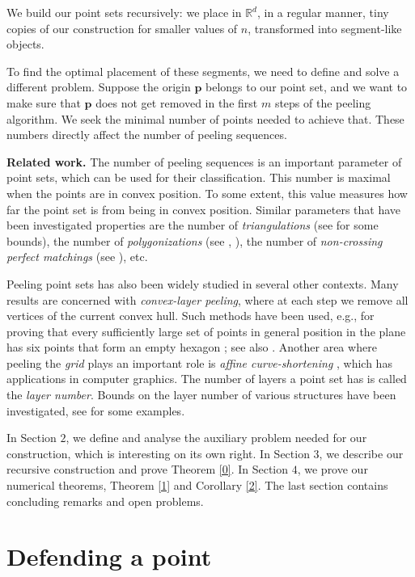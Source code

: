 \documentclass[a4paper,UKenglish,cleveref, autoref, thm-restate]{lipics-v2021}
\def\R{\mathbb{R}}
\begin{document}
   We build our point sets recursively: we place in $\R^d$, in a regular manner, tiny copies of our construction for smaller values of $n$, transformed into segment-like objects.

   To find the optimal placement of these segments, we need to define and solve a different problem. Suppose the origin $\mathbf{p}$ belongs to our point set, and we want to make sure that $\mathbf{p}$ does not get removed in the first $m$ steps of the peeling algorithm. We seek the minimal number of points needed to achieve that. These numbers directly affect the number of peeling sequences.
\smallskip

   \textbf{Related work.} The number of peeling sequences is an important parameter of point sets, which can be used for their classification. This number is maximal when the points are in convex position. To some extent, this value measures how far the point set is from being in convex position. Similar parameters that have been investigated properties are the number of \emph{triangulations} (see \cite{triang3, triang2, triang1} for some bounds), the number of \emph{polygonizations} (see \cite{poly1}, \cite{poly2}), the number of \emph{non-crossing perfect matchings} (see \cite{matching1}), etc.

    Peeling point sets has also been widely studied in several other contexts. Many results are concerned with \emph{convex-layer peeling}, where at each step we remove all vertices of the current convex hull. Such methods have been used, e.g., for proving that every sufficiently large set of points in general position in the plane has six points that form an empty hexagon \cite{gerken}\cite{nicolas}; see also \cite{dumremark}. Another area where peeling the \emph{grid} plays an important role is \emph{affine curve-shortening} \cite{alvarez, grid2, sapiro}, which has applications in computer graphics. The number of layers a point set has is called the \emph{layer number}. Bounds on the layer number of various structures have been investigated, see \cite{even1, even2, grid1} for some examples.
   
     In Section $2$, we define and analyse the auxiliary problem needed for our construction, which is interesting on its own right. In Section $3$, we describe our recursive construction and prove Theorem \ref{0}. In Section $4$, we prove our numerical theorems, Theorem \ref{1} and Corollary \ref{2}. The last section contains concluding remarks and open problems. 

   \section{Defending a point}
\end{document}
